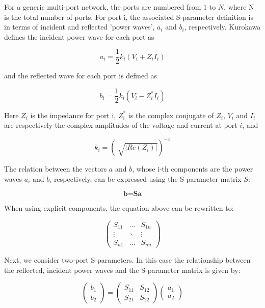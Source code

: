 \documentclass[a4paper,12pt]{report}
\begin{document}
For a generic multi-port network, the ports are numbered from $1$ to $N$,
where N is the total number of ports. 
For port i,
the associated S-parameter definition is in terms of
incident and reflected 'power waves',
$a_i$ and $b_i$, respectively.
Kurokawa \cite{1125964} defines the incident power wave for each port as

\begin{equation}
  a_i = \frac{1}{2}k_i (V_i + Z_i I_i)
\end{equation}

and the reflected wave for each port is defined as

\begin{equation}
  b_i = \frac{1}{2}k_i (V_i - Z_i^* I_i)
\end{equation}

Here $Z_i$ is the impedance for port i,
$Z_{i}^{*}$ is the complex conjugate of $Z_{i}$,
$V_{i}$ and $I_{i}$ are respectively the complex amplitudes
of the voltage and current at port $i$,
and

\begin{equation}
  k_i = \left(\sqrt[]{|Re(Z_i)|}\right)^{-1}
\end{equation}

The relation between the vectors $a$ and $b$,
whose i-th components are the power waves $a_{i}$
and $b_{i}$ respectively,
can be expressed using the S-parameter matrix $S$:

\begin{equation}
  \textbf{b} = \textbf{S} \textbf{a}
\end{equation}

When using explicit components, the equation above can be rewritten to:

\begin{equation}
  \begin{pmatrix}
    S_{11} & \dots  &S_{1n} \\
    \vdots & \ddots & \vdots \\
    S_{n1} & \dots  & S_{nn}
  \end{pmatrix}
\end{equation}

Next, we consider two-port S-parameters.
In this case the relationship between the reflected,
incident power waves and the S-parameter matrix is given by:

\begin{equation}
  \left(
    \begin{array}{c}
      b_1 \\
      b_2
    \end{array}
  \right) = \begin{pmatrix}
    S_{11} & S_{12} \\
    S_{21} & S_{22}
  \end{pmatrix}
  \left(
    \begin{array}{c}
      a_1 \\
      a_2
    \end{array}
  \right)
\end{equation}
\end{document}
